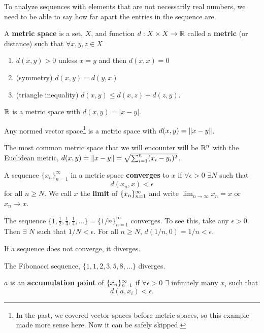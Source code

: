 To analyze sequences with elements that are not necessarily real
numbers, we need to be able to say how far apart the entries in the
sequence are. 
\begin{definition}
  A \textbf{metric space} is a set, $X$, and function $d:X\times X
  \rightarrow \mathbb{R}$ called a \textbf{metric} (or distance) such that
  $\forall x, y, z \in X$
  \begin{enumerate}
  \item $d(x,y) > 0$ unless $x=y$ and then $d(x,x) = 0$
  \item (symmetry) $d(x,y) = d(y,x)$
  \item (triangle inequality) $d(x,y) \leq d(x,z) + d(z,y)$.
  \end{enumerate}
\end{definition}
\begin{example}
  $\mathbb{R}$ is a metric space with $d(x,y) = |x - y|$. 
\end{example}
\begin{example}
  Any normed vector space\footnote{In the past, we covered vector
    spaces before metric spaces, so this example made more sense
    here. Now it can be safely skipped.} is a metric space with $d(x,y) =
  \left\Vert {x-y} \right\Vert$. 
\end{example}
The most common metric space that we will encounter will be $\mathbb{R}^n$
with the Euclidean metric, $d(x,y) = \left\Vert {x-y} \right\Vert = \sqrt{\sum_{i=1}^n
  (x_i - y_i)^2}$.  
\begin{definition}
  A sequence $\{x_n\}_{n=1}^\infty$ in a metric space \textbf{converges} to $x$
  if $\forall \epsilon > 0$ $\exists N$ such that 
  \[ d(x_n, x) < \epsilon \]
  for all $n \geq N$. We call $x$ the \textbf{limit} of $\{{x}_n \}_{n=1}^\infty$ and
  write $\lim_{n \rightarrow \infty} x_n = x$ or $x_n \rightarrow x$. 
\end{definition}
\begin{example}
  The sequence $\{ 1, \frac{1}{2}, \frac{1}{3}, \frac{1}{4}, ... \} =
  \{1/n\}_{n=1}^\infty$ converges. To see this, take any
  $\epsilon>0$. Then $\exists$ $N$ such that $1/N < \epsilon$. For all
  $n \geq N$, $d(1/n,0) = 1/n < \epsilon$. 
\end{example}
If a sequence does not converge, it diverges. 
\begin{example}
  The Fibonacci sequence, $\{ 1, 1, 2, 3, 5, 8, ... \}$ diverges.
\end{example}
\begin{definition}
  $a$ is an \textbf{accumulation point} of $\{{x}_n \}_{n=1}^\infty$ if $\forall
  \epsilon > 0$ $\exists$ infinitely many $x_i$ such that 
  \[ d(a, x_i ) < \epsilon. \]
\end{definition}
